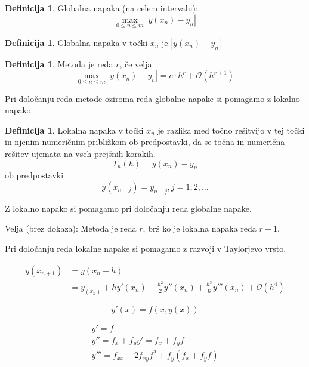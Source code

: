 \documentclass[a4paper,12pt]{article}
\theoremstyle{definition}
\newtheorem{defn}[counter]{Definicija}
\theoremstyle{remark}
\begin{document}
\begin{defn}
    Globalna napaka (na celem intervalu):
    \begin{equation*}
        \max_{0 \leq n \leq m} |y(x_n) - y_n|
    \end{equation*}
\end{defn}

\begin{defn}
    Globalna napaka v točki $x_n$ je $|y(x_n) - y_n|$
\end{defn}

\begin{defn}
    Metoda je reda $r$, če velja
    \begin{equation*}
        \max_{0 \leq n \leq m} |y(x_n) - y_n| = c \cdot h^r + \mathcal{O} (h^{r+1})
    \end{equation*}
\end{defn}

Pri določanju reda metode oziroma reda globalne napake si pomagamo z lokalno napako.

\begin{defn}
    Lokalna napaka v točki $x_n$ je razlika med točno rešitvijo v tej točki in njenim numeričnim približkom ob predpostavki,
    da se točna in numerična rešitev ujemata na vseh prejšnih korakih.
    \begin{equation*}
        T_n(h) = y(x_n) - y_n
    \end{equation*}
    ob predpostavki
    \begin{equation*}
        y(x_{n-j}) = y_{n-j}, j=1, 2, \dots
    \end{equation*}
\end{defn}

Z lokalno napako si pomagamo pri določanju reda globalne napake.

Velja (brez dokaza): Metoda je reda $r$, brž ko je lokalna napaka reda $r+1$.

Pri določanju reda lokalne napake si pomagamo z razvoji v Taylorjevo vrsto.

\begin{align*}
    y(x_{n+1}) &= y(x_n + h) \\
               &= y_(x_n) + h y'(x_n) + \frac{h^2}{2} y''(x_n) + \frac{h^3}{6} y'''(x_n) + \mathcal{O}(h^4)
\end{align*}

\begin{equation*}
    y'(x) = f(x, y(x))
\end{equation*}

\begin{gather*}
    y' = f \\
    y'' = f_x + f_y y' = f_x + f_yf \\
    y''' = f_{xx} + 2 f_{xy} f^2 + f_y(f_x + f_y f)
\end{gather*}
\end{document}
